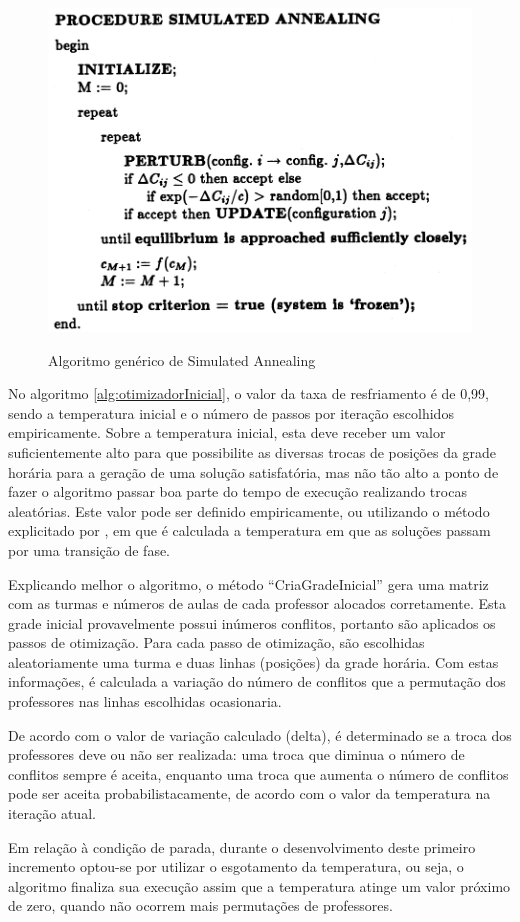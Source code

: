 \begin{figure}[h]
	\centering
	\caption{Algoritmo genérico de Simulated Annealing}
	\includegraphics[width=1\textwidth]{./dados/figuras/procedure_simulated_annealing}
	\label{fig:procedure}
\end{figure}

No algoritmo \ref{alg:otimizadorInicial}, o valor da taxa de resfriamento é de 0,99, sendo a temperatura inicial e o número de passos por iteração escolhidos empiricamente. Sobre a temperatura inicial, esta deve receber um valor suficientemente alto para que possibilite as diversas trocas de posições da grade horária para a geração de uma solução satisfatória, mas não tão alto a ponto de fazer o algoritmo passar boa parte do tempo de execução realizando trocas aleatórias. Este valor 
pode ser definido empiricamente, ou utilizando o método explicitado por , em que é calculada a temperatura em que as soluções passam por uma transição de fase.

Explicando melhor o algoritmo, o método ``CriaGradeInicial''  gera uma matriz com as turmas e números de aulas de cada professor alocados corretamente. Esta grade inicial provavelmente possui inúmeros conflitos, portanto são aplicados os passos de otimização. Para cada passo de otimização, são escolhidas aleatoriamente uma turma e duas linhas (posições) da grade horária. Com estas informações, é calculada a variação do número de conflitos que a permutação dos professores nas linhas escolhidas ocasionaria. 

De acordo com o valor de variação calculado (delta), é determinado se a troca dos professores deve ou não ser realizada: uma troca que diminua o número de conflitos sempre é aceita, enquanto uma troca que aumenta o número de conflitos pode ser aceita probabilistacamente, de acordo com o valor da temperatura na iteração atual.

Em relação à condição de parada, durante o desenvolvimento deste primeiro incremento optou-se por utilizar o esgotamento da temperatura, ou seja, o algoritmo finaliza sua execução assim que a temperatura atinge um valor próximo de zero, quando não ocorrem mais permutações de professores.


